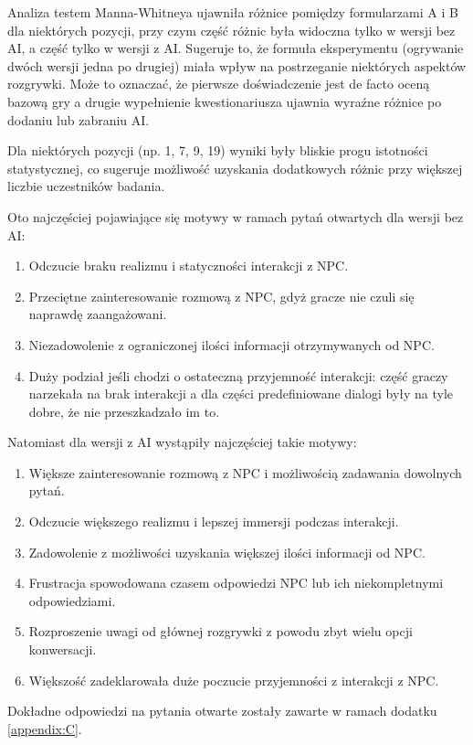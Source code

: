 Analiza testem Manna-Whitneya ujawniła różnice pomiędzy formularzami A i B dla niektórych pozycji, przy 
czym część różnic była widoczna tylko w wersji bez AI, a część tylko w wersji z AI. Sugeruje to, że formuła 
eksperymentu (ogrywanie dwóch wersji jedna po drugiej) miała wpływ na postrzeganie niektórych aspektów
rozgrywki. Może to oznaczać, że pierwsze doświadczenie jest de facto oceną bazową gry a drugie wypełnienie
kwestionariusza ujawnia wyraźne różnice po dodaniu lub zabraniu AI.

Dla niektórych pozycji (np. 1, 7, 9, 19) wyniki były bliskie progu istotności statystycznej, co 
sugeruje możliwość uzyskania dodatkowych różnic przy większej liczbie uczestników badania.

\vspace{10pt}

Oto najczęściej pojawiające się motywy w ramach pytań otwartych dla wersji bez AI:

\begin{enumerate}
    \item Odczucie braku realizmu i statyczności interakcji z NPC.
    \item Przeciętne zainteresowanie rozmową z NPC, gdyż gracze nie czuli się naprawdę zaangażowani.
    \item Niezadowolenie z ograniczonej ilości informacji otrzymywanych od NPC.
    \item Duży podział jeśli chodzi o ostateczną przyjemność interakcji: część graczy
        narzekała na brak interakcji a dla części predefiniowane dialogi były na tyle dobre,
        że nie przeszkadzało im to.
\end{enumerate}

Natomiast dla wersji z AI wystąpiły najczęściej takie motywy:

\begin{enumerate}
    \item Większe zainteresowanie rozmową z NPC i możliwością zadawania dowolnych pytań.
    \item Odczucie większego realizmu i lepszej immersji podczas interakcji.
    \item Zadowolenie z możliwości uzyskania większej ilości informacji od NPC.
    \item Frustracja spowodowana czasem odpowiedzi NPC lub ich niekompletnymi odpowiedziami.
    \item Rozproszenie uwagi od głównej rozgrywki z powodu zbyt wielu opcji konwersacji.
    \item Większość zadeklarowała duże poczucie przyjemności z interakcji z NPC. 
\end{enumerate}

Dokładne odpowiedzi na pytania otwarte zostały zawarte w ramach dodatku \ref{appendix:C}.